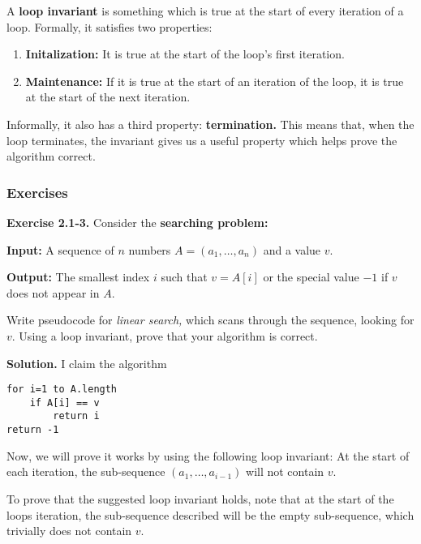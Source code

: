 \documentclass{article}
\newcommand{\exec}[2]
{\textbf{Exercise #1.} #2

\textbf{Solution.}}
\begin{document}
\vspace{5mm}

\begin{tcolorbox}[title=Loop Invariant]
	A \textbf{loop invariant} is something which is true at the start of every iteration of a loop. Formally, it satisfies two properties:
	\begin{enumerate}
		\item \textbf{Initalization:} It is true at the start of the loop's first iteration.
		\item \textbf{Maintenance:} If it is true at the start of an iteration of the loop, it is true at the start of the next iteration.
	\end{enumerate}

	Informally, it also has a third property: \textbf{termination.} This means that, when the loop terminates, the invariant gives us a useful property which helps prove the algorithm correct.
\end{tcolorbox}

\subsubsection{Exercises}

\exec{2.1-3}{Consider the \textbf{searching problem:}
\begin{tcolorbox}[title=Searching Problem]
	\textbf{Input:} A sequence of $n$ numbers $A = (a_1, \dots, a_n)$ and a value $v.$

	\textbf{Output:} The smallest index $i$ such that $v = A[i]$ or the special value $-1$ if $v$ does not appear in $A.$
\end{tcolorbox}

Write pseudocode for \textit{linear search,} which scans through the sequence, looking for $v.$ Using a loop invariant, prove that your algorithm is correct.}
I claim the algorithm

\begin{lstlisting}
for i=1 to A.length
	if A[i] == v
		return i
return -1
\end{lstlisting}

Now, we will prove it works by using the following loop invariant: At the start of each iteration, the sub-sequence $(a_1, \dots, a_{i-1})$ will not contain $v.$

To prove that the suggested loop invariant holds, note that at the start of the loops iteration, the sub-sequence described will be the empty sub-sequence, which trivially does not contain $v.$
\end{document}
